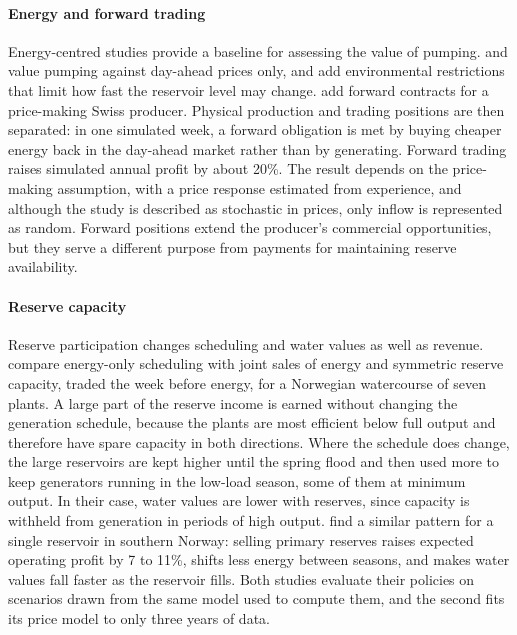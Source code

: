\paragraph{Energy and forward trading}
Energy-centred studies provide a baseline for assessing the value of
pumping. \citet{ak2019quantifying} and \citet{alic2023optimal} value
pumping against day-ahead prices only, and \citet{alic2023optimal} add
environmental restrictions that limit how fast the reservoir level may
change. \citet{abgottspon2013stochastic} add forward contracts for a
price-making Swiss producer. Physical production and trading positions
are then separated: in one simulated week, a forward obligation is met
by buying cheaper energy back in the day-ahead market rather than by
generating. Forward trading raises simulated annual profit by about
20\%. The result depends on the price-making assumption, with a price
response estimated from experience, and although the study is described
as stochastic in prices, only inflow is represented as random. Forward
positions extend the producer's commercial opportunities, but they serve
a different purpose from payments for maintaining reserve availability.

\paragraph{Reserve capacity}
Reserve participation changes scheduling and water values as well as
revenue. \citet{helseth2016} compare energy-only scheduling with joint
sales of energy and symmetric reserve capacity, traded the week before
energy, for a Norwegian watercourse of seven plants. A large part of the
reserve income is earned without changing the generation schedule,
because the plants are most efficient below full output and therefore
have spare capacity in both directions. Where the schedule does change,
the large reservoirs are kept higher until the spring flood and then
used more to keep generators running in the low-load season, some of
them at minimum output. In their case, water values are lower with reserves, since
capacity is withheld from generation in periods of high output.
\citet{helseth2017iet} find a similar pattern for a single reservoir in
southern Norway: selling primary reserves raises expected operating
profit by 7 to 11\%, shifts less energy between seasons, and makes water
values fall faster as the reservoir fills. Both studies evaluate their
policies on scenarios drawn from the same model used to compute them,
and the second fits its price model to only three years of data.

